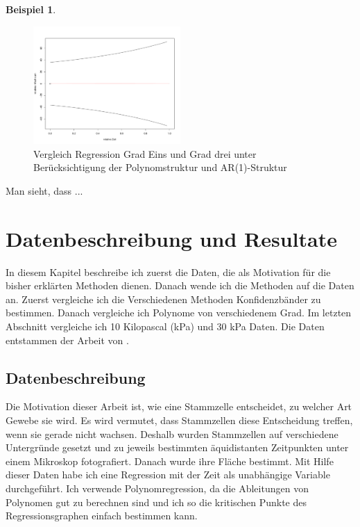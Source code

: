 \documentclass[12pt,a4paper]{article}
\theoremstyle{definition}
\newtheorem{Beispiel}[Definition]{Beispiel}
\theoremstyle{definition}
\theoremstyle{definition}
\begin{document}
\begin{Beispiel}
\begin{figure}[H] 
  \centering
     \includegraphics[width=0.5\textwidth]{Bsp-KB-poly-hetero-AR}
  \caption{Vergleich Regression Grad Eins und Grad drei unter Berücksichtigung der Polynomstruktur und AR(1)-Struktur}
  \label{Bsp-KB-poly-hetero-AR}
\end{figure}

Man sieht, dass ...

\end{Beispiel}





\newpage
\section{Datenbeschreibung und Resultate}
In diesem Kapitel beschreibe ich zuerst die Daten, die als Motivation für die bisher erklärten Methoden dienen. Danach wende ich die Methoden auf die Daten an. Zuerst vergleiche ich die Verschiedenen Methoden Konfidenzbänder zu bestimmen. Danach vergleiche ich Polynome von verschiedenem Grad. Im letzten Abschnitt vergleiche ich 10 Kilopascal (kPa) und 30 kPa Daten. Die Daten entstammen der Arbeit von \cite{Rehfeldt10}.

\subsection{Datenbeschreibung}
Die Motivation dieser Arbeit ist, wie eine Stammzelle entscheidet, zu welcher Art Gewebe sie wird. Es wird vermutet, dass Stammzellen diese Entscheidung treffen, wenn sie gerade nicht wachsen. Deshalb wurden Stammzellen auf verschiedene Untergründe gesetzt und zu jeweils bestimmten äquidistanten Zeitpunkten unter einem Mikroskop fotografiert. Danach wurde ihre Fläche bestimmt. Mit Hilfe dieser Daten habe ich eine Regression mit der Zeit als unabhängige Variable durchgeführt. Ich verwende Polynomregression, da die Ableitungen von Polynomen gut zu berechnen sind und ich so die kritischen Punkte des Regressionsgraphen einfach bestimmen kann.
\end{document}
